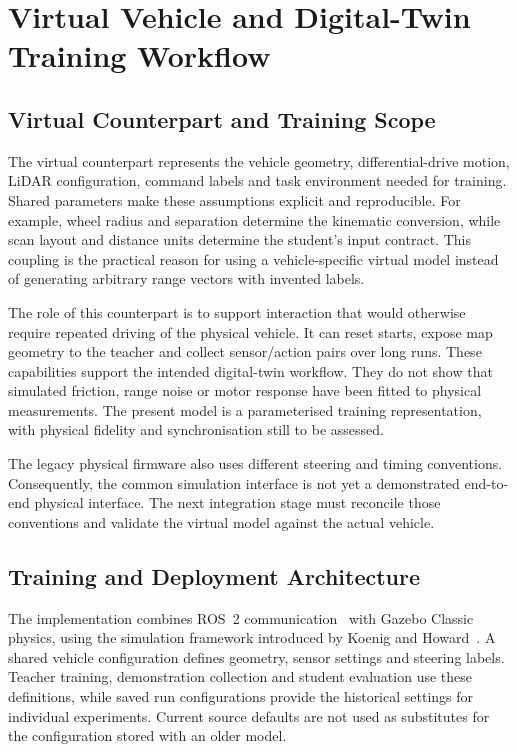 \chapter{Virtual Vehicle and Digital-Twin Training Workflow}
\label{ch:system}
\section{Virtual Counterpart and Training Scope}
The virtual counterpart represents the vehicle geometry, differential-drive
motion, LiDAR configuration, command labels and task environment needed for
training. Shared parameters make these assumptions explicit and reproducible.
For example, wheel radius and separation determine the kinematic conversion,
while scan layout and distance units determine the student's input contract.
This coupling is the practical reason for using a vehicle-specific virtual
model instead of generating arbitrary range vectors with invented labels.

The role of this counterpart is to support interaction that would otherwise
require repeated driving of the physical vehicle. It can reset starts, expose
map geometry to the teacher and collect sensor/action pairs over long runs.
These capabilities support the intended digital-twin workflow. They do not
show that simulated friction, range noise or motor response have been fitted
to physical measurements. The present model is a parameterised training
representation, with physical fidelity and synchronisation still to be assessed.

The legacy physical firmware also uses different steering and timing conventions.
Consequently, the common simulation interface is not yet a demonstrated
end-to-end physical interface. The next integration stage must reconcile
those conventions and validate the virtual model against the actual vehicle.

\section{Training and Deployment Architecture}
The implementation combines ROS~2 communication~\cite{macenski2022ros2}
with Gazebo Classic physics, using the simulation framework introduced by
Koenig and Howard~\cite{koenig2004gazebo}.
A shared vehicle configuration defines geometry, sensor settings and steering
labels. Teacher training, demonstration collection and student evaluation use
these definitions, while saved run configurations provide the historical
settings for individual experiments. Current source defaults are not used as
substitutes for the configuration stored with an older model.

